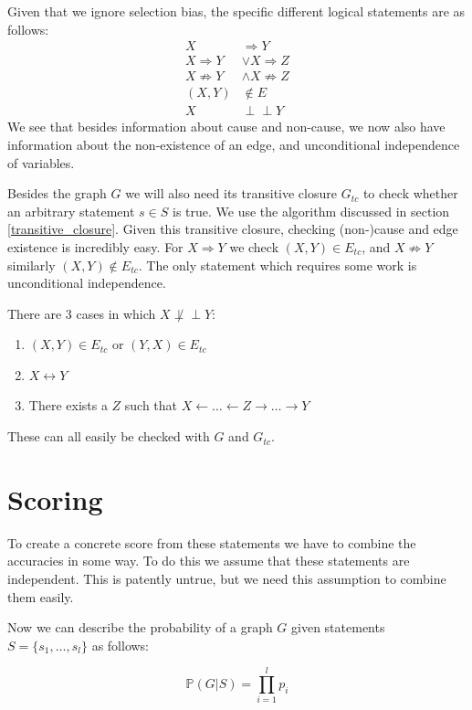 \documentclass[11pt,a4paper]{report}
\theoremstyle{definition}
\def\ci{\perp\!\!\!\perp}
\begin{document}
Given that we ignore selection bias, the specific different logical
statements are as follows:
\begin{align*}
  X &\Rightarrow Y \\
  X \Rightarrow Y &\lor X \Rightarrow Z \\
  X \not \Rightarrow Y &\land X \not \Rightarrow Z \\
  (X, Y) &\notin E \\
  X &\ci Y
\end{align*}
We see that besides information about cause and non-cause, we now also
have information about the non-existence of an edge, and unconditional
independence of variables.

Besides the graph $G$ we will also need its transitive closure $G_{tc}$ to
check whether an arbitrary statement $s \in S$ is true. We use the
algorithm discussed in section \ref{transitive_closure}. Given this
transitive closure, checking (non-)cause and edge existence is incredibly
easy. For $X \Rightarrow Y$ we check $(X, Y) \in E_{tc}$, and $X \not
\Rightarrow Y$ similarly $(X, Y) \notin E_{tc}$. The only statement which
requires some work is unconditional independence.

There are 3 cases in which $X \not \ci Y$:
\begin{enumerate}
  \item $(X, Y) \in E_{tc}$ or $(Y, X) \in E_{tc}$

  \item $X \leftrightarrow Y$

  \item There exists a $Z$ such that $X \leftarrow \ldots \leftarrow Z
    \rightarrow \ldots \rightarrow Y$
\end{enumerate}
These can all easily be checked with $G$ and $G_{tc}$.

\section{Scoring}\label{sec:scoring}
To create a concrete score from these statements we have to combine the
accuracies in some way. To do this we assume that these statements are
independent. This is patently untrue, but we need this assumption to
combine them easily.

Now we can describe the probability of a graph $G$ given statements $S =
\{s_1, \ldots, s_l\}$ as follows:

\begin{equation*}
  \mathbb{P}(G | S) = \prod ^l_{i=1} p_i
\end{equation*}
\end{document}
